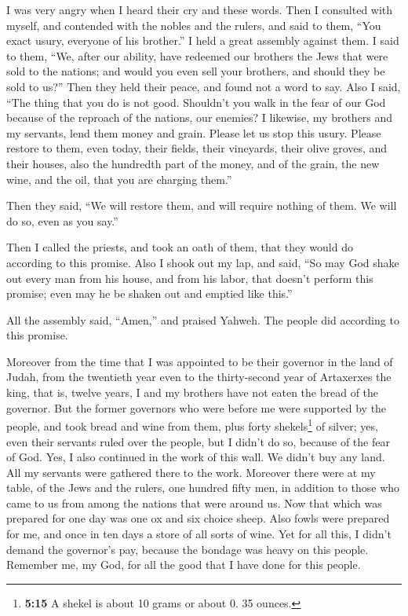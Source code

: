  I was very angry when I heard their cry and these words.
 Then I consulted with myself, and contended with the
nobles and the rulers, and said to them, ``You exact usury, everyone of
his brother.'' I held a great assembly against them.  I
said to them, ``We, after our ability, have redeemed our brothers the
Jews that were sold to the nations; and would you even sell your
brothers, and should they be sold to us?'' Then they held their peace,
and found not a word to say.  Also I said, ``The thing
that you do is not good. Shouldn't you walk in the fear of our God
because of the reproach of the nations, our enemies?  I
likewise, my brothers and my servants, lend them money and grain. Please
let us stop this usury.  Please restore to them, even
today, their fields, their vineyards, their olive groves, and their
houses, also the hundredth part of the money, and of the grain, the new
wine, and the oil, that you are charging them.''

 Then they said, ``We will restore them, and will require
nothing of them. We will do so, even as you say.''

Then I called the priests, and took an oath of them, that they would do
according to this promise.  Also I shook out my lap, and
said, ``So may God shake out every man from his house, and from his
labor, that doesn't perform this promise; even may he be shaken out and
emptied like this.''

All the assembly said, ``Amen,'' and praised Yahweh. The people did
according to this promise.

 Moreover from the time that I was appointed to be their
governor in the land of Judah, from the twentieth year even to the
thirty-second year of Artaxerxes the king, that is, twelve years, I and
my brothers have not eaten the bread of the governor. 
But the former governors who were before me were supported by the
people, and took bread and wine from them, plus forty shekels\footnote{\textbf{5:15}
  A shekel is about 10 grams or about 0. 35 ounces.} of silver; yes,
even their servants ruled over the people, but I didn't do so, because
of the fear of God.  Yes, I also continued in the work of
this wall. We didn't buy any land. All my servants were gathered there
to the work.  Moreover there were at my table, of the
Jews and the rulers, one hundred fifty men, in addition to those who
came to us from among the nations that were around us. 
Now that which was prepared for one day was one ox and six choice sheep.
Also fowls were prepared for me, and once in ten days a store of all
sorts of wine. Yet for all this, I didn't demand the governor's pay,
because the bondage was heavy on this people.  Remember
me, my God, for all the good that I have done for this people.

